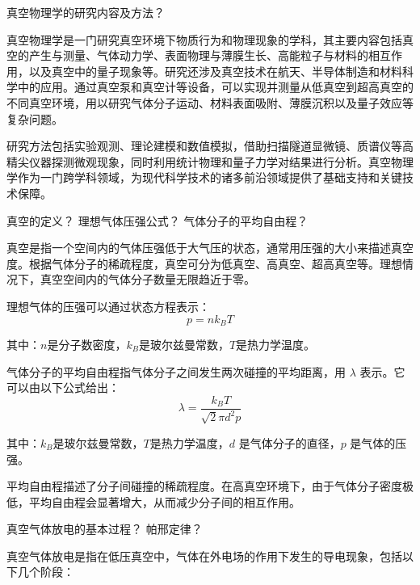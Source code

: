 \documentclass[dvipsnames, svgnames,a4paper,11pt]{article}
\begin{document}
\begin{question}
	真空物理学的研究内容及方法？
\end{question}

	真空物理学是一门研究真空环境下物质行为和物理现象的学科，其主要内容包括真空的产生与测量、气体动力学、表面物理与薄膜生长、高能粒子与材料的相互作用，以及真空中的量子现象等。研究还涉及真空技术在航天、半导体制造和材料科学中的应用。通过真空泵和真空计等设备，可以实现并测量从低真空到超高真空的不同真空环境，用以研究气体分子运动、材料表面吸附、薄膜沉积以及量子效应等复杂问题。

	研究方法包括实验观测、理论建模和数值模拟，借助扫描隧道显微镜、质谱仪等高精尖仪器探测微观现象，同时利用统计物理和量子力学对结果进行分析。真空物理学作为一门跨学科领域，为现代科学技术的诸多前沿领域提供了基础支持和关键技术保障。



\begin{question}
	真空的定义？ 理想气体压强公式？ 气体分子的平均自由程？
\end{question}

	真空是指一个空间内的气体压强低于大气压的状态，通常用压强的大小来描述真空度。根据气体分子的稀疏程度，真空可分为低真空、高真空、超高真空等。理想情况下，真空空间内的气体分子数量无限趋近于零。

	理想气体的压强可以通过状态方程表示：
	\[
		p = n k_B T
	\]

	其中：$n$是分子数密度，$k_B$是玻尔兹曼常数，$T$是热力学温度。

	气体分子的平均自由程指气体分子之间发生两次碰撞的平均距离，用 $\lambda$ 表示。它可以由以下公式给出：
	\[
		\lambda = \frac{k_B T}{\sqrt{2} \pi d^2 p}
	\]
	 
	其中：$k_B$是玻尔兹曼常数，$T$是热力学温度，$d$ 是气体分子的直径，$p$ 是气体的压强。
	
	平均自由程描述了分子间碰撞的稀疏程度。在高真空环境下，由于气体分子密度极低，平均自由程会显著增大，从而减少分子间的相互作用。
	
	
	
	
	
	
	




\begin{question}
	真空气体放电的基本过程？ 帕邢定律？
\end{question}

	真空气体放电是指在低压真空中，气体在外电场的作用下发生的导电现象，包括以下几个阶段：
	
\end{document}
